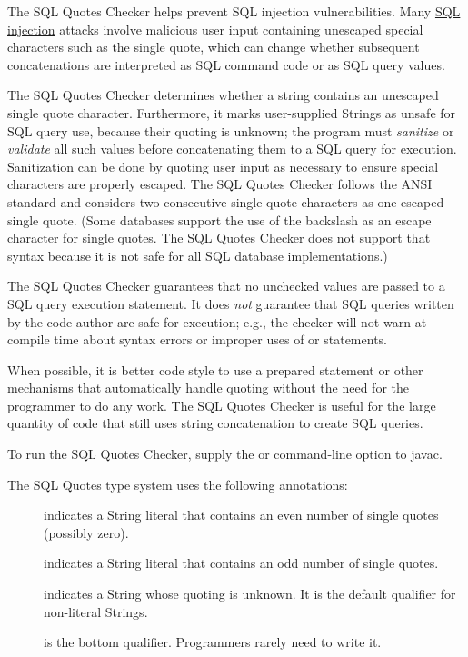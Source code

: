\htmlhr
{}

The SQL Quotes Checker helps prevent SQL injection vulnerabilities. Many
\href{https://en.wikipedia.org/wiki/Sql_injection}{SQL injection} attacks
involve malicious user input containing unescaped special characters such as the
single quote, which can change whether subsequent concatenations are interpreted
as SQL command code or as SQL query values.

The SQL Quotes Checker determines whether a string contains an unescaped
single quote character.  Furthermore, it marks user-supplied Strings as
unsafe for SQL query use, because their quoting is unknown; the program
must \emph{sanitize} or \emph{validate} all such values before concatenating
them to a SQL query for execution. Sanitization can be done by quoting user
input as necessary to ensure special characters are properly escaped.  The
SQL Quotes Checker follows the ANSI standard and considers two consecutive
single quote characters as one escaped single quote.  (Some databases
support the use of the backslash as an escape character for single quotes.
The SQL Quotes Checker does not support that syntax because it is not safe
for all SQL database implementations.)

The SQL Quotes Checker guarantees that no unchecked values are passed to a
SQL query execution statement.  It does \emph{not} guarantee that SQL
queries written by the code author are safe for execution; e.g., the
checker will not warn at compile time about syntax errors or improper uses
of  or  statements.

When possible, it is better code style to use a prepared statement or other mechanisms
that automatically handle quoting without the need for the programmer to do
any work.  The SQL Quotes Checker is useful for the large quantity of code
that still uses string concatenation to create SQL queries.

To run the SQL Quotes Checker, supply the
or
command-line option to javac.



The SQL Quotes type system uses the following annotations:

\begin{description}
\item[]
    indicates a String literal that contains an even number of
    single quotes (possibly zero).
\item[]
    indicates a String literal that contains an odd number of single
    quotes.
\item[]
    indicates a String whose quoting is unknown.
    It is the default qualifier for non-literal
    Strings.
\item[]
    is the bottom qualifier.  Programmers rarely need to write it.
\end{description}

